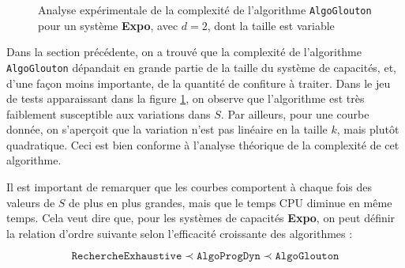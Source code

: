 \documentclass[12pt,a4paper]{article}
\begin{document}
 \begin{figure}[!h]
  \centering
  \captionsetup{justification=centering}
  \caption[Analyse exp\'erimentale de \texttt{AlgoGlouton}]{Analyse exp\'erimentale de la complexit\'e de l'algorithme \texttt{AlgoGlouton} pour un syst\`eme {\bfseries Expo}, avec $d=2$, dont la taille est variable}
  \label{fig:comp_ga}
\end{figure}

\newpage

Dans la section pr\'ec\'edente, on a trouv\'e que la complexit\'e de l'algorithme \texttt{AlgoGlouton} d\'epandait en grande partie de la taille du syst\`eme de capacit\'es, et, d'une fa\c{c}on moins importante, de la quantit\'e de confiture \`a traiter. Dans le jeu de tests apparaissant dans la figure \ref{fig:comp_ga}, on observe que l'algorithme est tr\`es faiblement susceptible aux variations dans $S$. Par ailleurs, pour une courbe donn\'ee, on s'aper\c{c}oit que la variation n'est pas lin\'eaire en la taille $k$, mais plut\^ot quadratique. Ceci est bien conforme \`a l'analyse th\'eorique de la complexit\'e de cet algorithme.

Il est important de remarquer que les courbes comportent \`a chaque fois des valeurs de $S$ de plus en plus grandes, mais que le temps CPU diminue en m\^eme temps. Cela veut dire que, pour les syst\`emes de capacit\'es {\bfseries Expo}, on peut d\'efinir la relation d'ordre suivante selon l'efficacit\'e croissante des algorithmes :

\begin{equation*}
  \texttt{RechercheExhaustive} \prec \texttt{AlgoProgDyn} \prec \texttt{AlgoGlouton}
\end{equation*}
\end{document}
